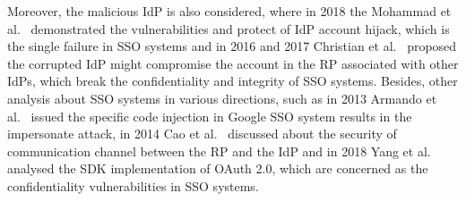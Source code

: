 

Moreover, the malicious IdP is also considered, where in 2018 the Mohammad et al.~\cite{GhasemisharifRC18} demonstrated the vulnerabilities and protect of IdP account hijack, which is the single failure in SSO systems and in 2016 and 2017 Christian et al.~\cite{MainkaMS16, MainkaMSW17} proposed the corrupted IdP might compromise the account in the RP associated with other IdPs, which break the confidentiality and integrity of SSO systems. Besides, other analysis about SSO systems in various directions, such as in 2013 Armando et al.~\cite{ArmandoCCCPS13} issued the specific code injection in Google SSO system results in the impersonate attack, in 2014 Cao et al.~\cite{CaoSBKVC14} discussed about the security of communication channel between the RP and the IdP and in 2018 Yang et al.~\cite{YangLCZ18} analysed the SDK implementation of OAuth 2.0, which are concerned as the confidentiality vulnerabilities in SSO systems.


